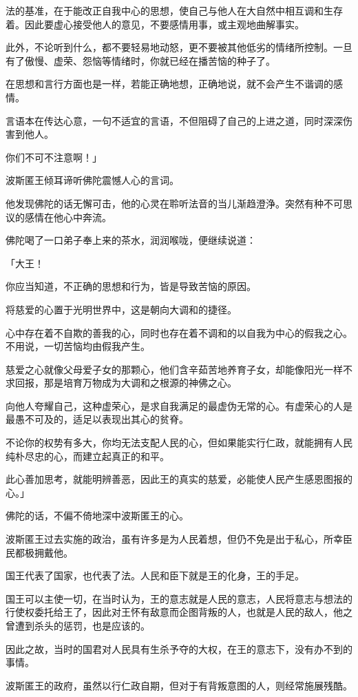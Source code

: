 \documentclass[twoside,openany]{book}
\begin{document}
法的基准，在于能改正自我中心的思想，使自己与他人在大自然中相互调和生存着。因此要虚心接受他人的意见，不要感情用事，或主观地曲解事实。

此外，不论听到什么，都不要轻易地动怒，更不要被其他低劣的情绪所控制。一旦有了傲慢、虚荣、怨恼等情绪时，你就已经在播苦恼的种子了。

在思想和言行方面也是一样，若能正确地想，正确地说，就不会产生不谐调的感情。

言语本在传达心意，一句不适宜的言语，不但阻碍了自己的上进之道，同时深深伤害到他人。

你们不可不注意啊！」

波斯匿王倾耳谛听佛陀震憾人心的言词。

他发现佛陀的话无懈可击，他的心灵在聆听法音的当儿渐趋澄浄。突然有种不可思议的感情在他心中奔流。

佛陀喝了一口弟子奉上来的茶水，润润喉咙，便继续说道：

「大王！

你应当知道，不正确的思想和行为，皆是导致苦恼的原因。

将慈爱的心置于光明世界中，这是朝向大调和的捷径。

心中存在着不自欺的善我的心，同时也存在着不调和的以自我为中心的假我之心。不用说，一切苦恼均由假我产生。

慈爱之心就像父母爱子女的那颗心，他们含辛茹苦地养育子女，却能像阳光一样不求回报，那是培育万物成为大调和之根源的神佛之心。

向他人夸耀自己，这种虚荣心，是求自我满足的最虚伪无常的心。有虚荣心的人是最愚不可及的，适足以表现出其心的贫脊。

不论你的权势有多大，你均无法支配人民的心，但如果能实行仁政，就能拥有人民纯朴尽忠的心，而建立起真正的和平。

此心善加思考，就能明辨善恶，因此王的真实的慈爱，必能使人民产生感恩图报的心。」

佛陀的话，不偏不倚地深中波斯匿王的心。

波斯匿王过去实施的政治，虽有许多是为人民着想，但仍不免是出于私心，所幸臣民都极拥戴他。

国王代表了国家，也代表了法。人民和臣下就是王的化身，王的手足。

国王可以主使一切，在当时认为，王的意志就是人民的意志，人民将意志与想法的行使权委托给王了，因此对王怀有敌意而企图背叛的人，也就是人民的敌人，他之曾遭到杀头的惩罚，也是应该的。

因此之故，当时的国君对人民具有生杀予夺的大权，在王的意志下，没有办不到的事情。

波斯匿王的政府，虽然以行仁政自期，但对于有背叛意图的人，则经常施展残酷。
\end{document}
